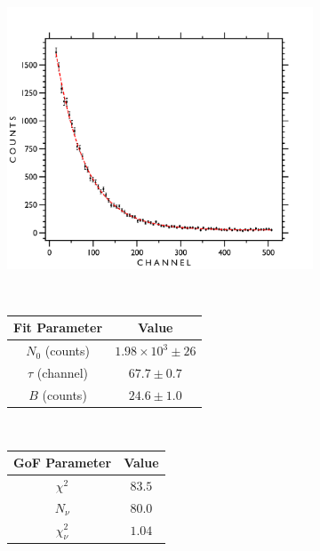 \documentclass[
    aps, 
    twocolumn, 
    secnumarabic, 
    balancelastpage, 
    amsmath, 
    amssymb, 
    nofootinbib, 
    floatfix
]{revtex4-2}
\begin{document}
\begin{figure}[t]
	\centering
     	\begin{subfigure}[t]{12cm}
         	\centering
		\includegraphics[width=12cm]{figures/muon_spectrum.png}
	\end{subfigure}
	\\
	\bigskip
	\begin{subfigure}[t]{12cm}
         	\centering
		\begin{tabular}{c|c}
            	\textbf{Fit Parameter} & \textbf{Value} \\
            	\hline
            	$N_0$ (counts) & $1.98 \times 10^{3} \pm 26$ \\ 
            	$\tau$ (channel) & $67.7 \pm 0.7$  \\
	    	$B$ (counts) & $24.6 \pm 1.0$  \\
		\end{tabular}
     	\end{subfigure}
     	\\
     	\bigskip
     	\begin{subfigure}[t]{12cm}
         	\centering
		\begin{tabular}{c|c}
            	\textbf{GoF Parameter} & \textbf{Value} \\
            	\hline
            	$\chi^2$ & $83.5$ \\ 
            	$N_\nu$ & $80.0$  \\
	    	$\chi^2_\nu$ & $1.04$ \\
		\end{tabular}

\end{subfigure}
\end{figure}
\end{document}
